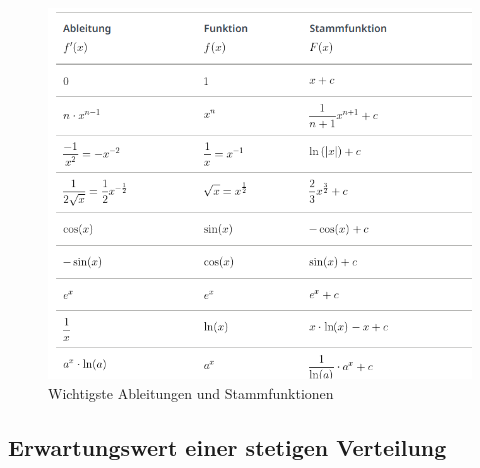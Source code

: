 \documentclass[../Main.tex]{subfiles}
\begin{document}
\begin{figure}[H]
    \centering
    \includegraphics[width=0.75\linewidth]{Images/wichtigste-ableitungen-int.png}
    \caption{Wichtigste Ableitungen und Stammfunktionen}
\end{figure}

\subsection{Erwartungswert einer stetigen Verteilung}
\end{document}
